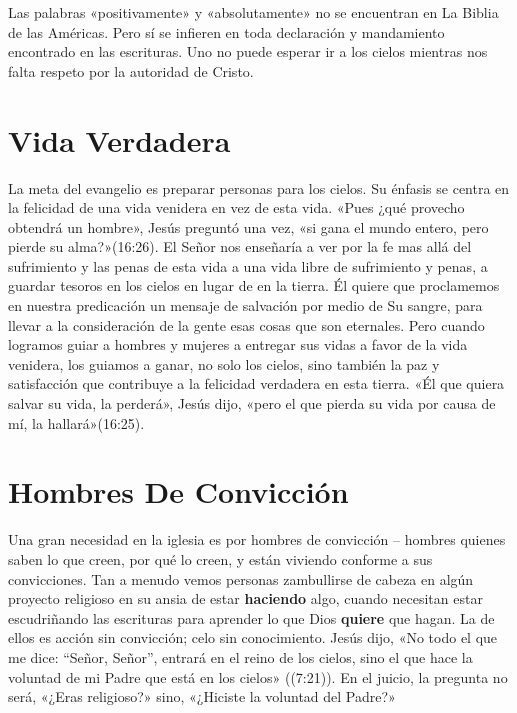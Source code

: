 \documentclass[12pt, twoside, openright]{book}
\begin{document}
Las palabras «positivamente» y «absolutamente» no se encuentran en La Biblia de las Américas. Pero sí se infieren en toda declaración y mandamiento encontrado en las escrituras. Uno no puede esperar ir a los cielos mientras nos falta respeto por la autoridad de Cristo.

\section{Vida Verdadera}
La meta del evangelio es preparar personas para los cielos. Su énfasis se centra en la felicidad de una vida venidera en vez de esta vida. «Pues ¿qué provecho obtendrá un hombre», Jesús preguntó una vez, «si gana el mundo entero, pero pierde su alma?»(16:26). El Señor nos enseñaría a ver por la fe mas allá del sufrimiento y las penas de esta vida a una vida libre de sufrimiento y penas, a guardar tesoros en los cielos en lugar de en la tierra. Él quiere que proclamemos en nuestra predicación un mensaje de salvación por medio de Su sangre, para llevar a la consideración de la gente esas cosas que son eternales. Pero cuando logramos guiar a hombres y mujeres a entregar sus vidas a favor de la vida venidera, los guiamos a ganar, no solo los cielos, sino también la paz y satisfacción que contribuye a la felicidad verdadera en esta tierra. «Él que quiera salvar su vida, la perderá», Jesús dijo, «pero el que pierda su vida por causa de mí, la hallará»(16:25).

\section{Hombres De Convicción}
Una gran necesidad en la iglesia es por hombres de convicción – hombres quienes saben lo que creen, por qué lo creen, y están viviendo conforme a sus convicciones. Tan a menudo vemos personas zambullirse de cabeza en algún proyecto religioso en su ansia de estar \textbf{haciendo} algo, cuando necesitan estar escudriñando las escrituras para aprender lo que Dios \textbf{quiere} que hagan. La de ellos es acción sin convicción; celo sin conocimiento. Jesús dijo, «No todo el que me dice: “Señor, Señor”, entrará en el reino de los cielos, sino el que hace la voluntad de mi Padre que está en los cielos» ((7:21)). En el juicio, la pregunta no será, «¿Eras religioso?» sino, «¿Hiciste la voluntad del Padre?»
\end{document}
